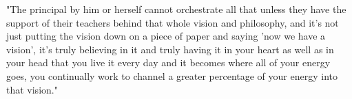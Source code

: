 "The principal by him or herself cannot orchestrate all that unless they have the support of their teachers behind that whole vision and philosophy, and it's not just putting the vision down on a piece of paper and saying 'now we have a vision', it's truly believing in it and truly having it in your heart as well as in your head that you live it every day and it becomes where all of your energy goes, you continually work to channel a greater percentage of your energy into that vision."